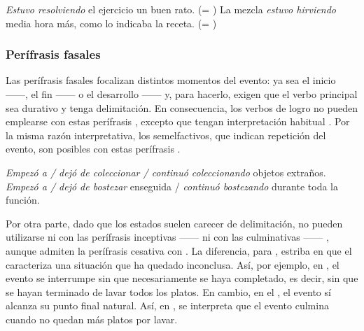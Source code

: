 \begin{exe}
  \ex\label{ex:08-resolviendo} \textit{Estuvo resolviendo} el ejercicio un buen
      rato. (= )
  \ex\label{ex:08-hirviendo} La mezcla \textit{estuvo hirviendo} media hora más,
      como lo indicaba la receta. (= )
\end{exe}

\subsubsection{Perífrasis fasales}\label{sec:08-fasales}

Las perífrasis fasales focalizan distintos momentos del evento: ya sea el inicio
------, el fin ------ o el desarrollo ------ y, para hacerlo, exigen
que el verbo principal sea durativo y tenga delimitación. En consecuencia, los
verbos de logro no pueden emplearse con estas perífrasis ,
excepto que tengan interpretación habitual . Por la
misma razón interpretativa, los semelfactivos, que indican repetición del
evento, son posibles con estas perífrasis .

\begin{exe}
  \ex\label{ex:08-coleccionar} \textit{Empezó a / dejó de coleccionar / continuó
      coleccionando} objetos extraños.
  \ex\label{ex:08-bostezar} \textit{Empezó a / dejó de bostezar} enseguida /
      \textit{continuó bostezando} durante toda la función.
\end{exe}

Por otra parte, dado que los estados suelen carecer de delimitación, no pueden
utilizarse ni con las perífrasis inceptivas ------
 ni con las culminativas ------
, aunque admiten la perífrasis cesativa con  . La diferencia, para \textcite[95]{cinque1999},
estriba en que el  caracteriza una situación que ha
quedado inconclusa. Así, por ejemplo, en , el
evento se interrumpe sin que necesariamente se haya completado, es decir, sin
que se hayan terminado de lavar todos los platos. En cambio, en el
, el evento sí alcanza su punto final natural. Así,
en , se interpreta que el evento culmina
cuando no quedan más platos por lavar.

